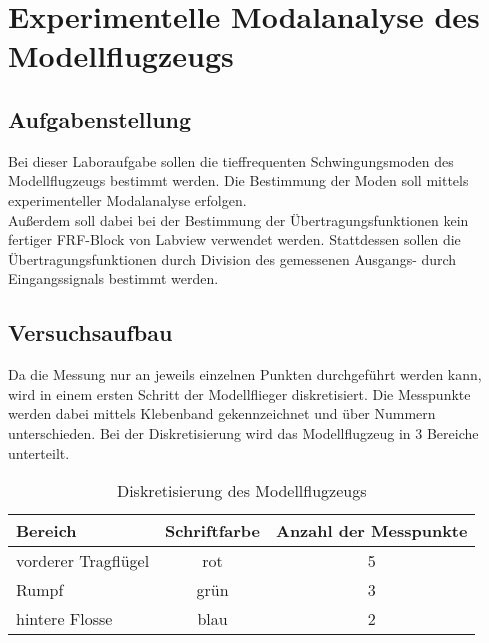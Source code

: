 \chapter{Experimentelle Modalanalyse des Modellflugzeugs}
\label{sec: Hauptkapitel 1}

\section{Aufgabenstellung}
    Bei dieser Laboraufgabe sollen die tieffrequenten Schwingungsmoden des
    Modellflugzeugs bestimmt werden. Die Bestimmung der Moden soll mittels
    experimenteller Modalanalyse erfolgen.
    \\

    \noindent
    Außerdem soll dabei bei der Bestimmung der Übertragungsfunktionen kein fertiger
    FRF-Block von Labview verwendet werden. Stattdessen sollen die
    Übertragungsfunktionen durch Division des gemessenen Ausgangs- durch
    Eingangssignals bestimmt werden.

\section{Versuchsaufbau}
    Da die Messung nur an jeweils einzelnen Punkten durchgeführt werden kann,
    wird in einem ersten Schritt der Modellflieger diskretisiert. Die Messpunkte
    werden dabei mittels Klebenband gekennzeichnet und über Nummern
    unterschieden. Bei der Diskretisierung wird das Modellflugzeug in 3 Bereiche
    unterteilt.

    \begin{table}[h]
        \centering
        \begin{tabular}{|l|c|c|}
            \hline
            \textbf{Bereich} &   \textbf{Schriftfarbe}    &   \textbf{Anzahl der Messpunkte}   \\
            \hline \hline
            vorderer Tragflügel &   rot &   5   \\
            \hline
            Rumpf   &   grün    &   3   \\
            \hline
            hintere Flosse  &   blau    &   2   \\
            \hline
        \end{tabular}
        \caption{Diskretisierung des Modellflugzeugs}
        \label{tab: Fliegerdiskretisierung}
    \end{table}

